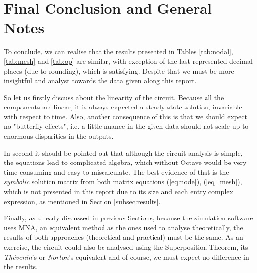 \section{Final Conclusion and General Notes}
\label{sec:conclusion}

To conclude, we can realise that the results presented in Tables \ref{tab:nodal}, \ref{tab:mesh} and \ref{tab:op} are similar, with exception of the last represented decimal places (due to rounding), which is satisfying. Despite that we must be more insightful and analyst towards the data given along this report. \par
So let us firstly discuss about the linearity of the circuit. Because all the components are linear, it is always expected a steady-state solution, invariable with respect to time. Also, another consequence of this is that we should expect no "butterfly-effects", i.e. a little nuance in the given data should not scale up to enormous disparities in the outputs. \par
In second it should be pointed out that although the circuit analysis is simple, the equations lead to complicated algebra, which without Octave would be very time consuming and easy to miscalculate. The best evidence of that is the \emph{symbolic} solution matrix from both matrix equations (\ref{eq:node}), (\ref{eq_mesh}), which is not presented in this report due to its size and each entry complex expression, as mentioned in Section \ref{subsec:results}. \par
Finally, as already discussed in previous Sections, because the simulation software uses MNA, an equivalent method as the ones used to analyse theoretically, the results of both approaches (theoretical and practical) must be the same. As an exercise, the circuit could also be analysed using the Superposition Theorem, its \textit{Thévenin}'s or \textit{Norton}'s equivalent and of course, we must expect no difference in the results. 
